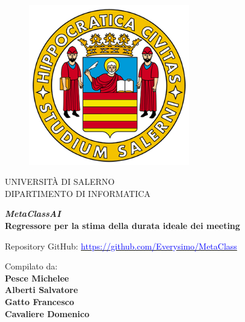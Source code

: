 \documentclass[a4paper, twoside, openright]{article}
\begin{document}
\begin{figure}[H]
    \centering
    \includegraphics[width=7cm]{img/logo.png}
\end{figure}

\begin{center}
    \LARGE{UNIVERSITÀ DI SALERNO}
    \vspace{1mm}
    \\ \large{DIPARTIMENTO DI INFORMATICA }
    \vspace{5mm}
\end{center}

\vspace{10mm}
\begin{center}
    {\LARGE{\bf \textit{MetaClassAI}\\\vspace{5mm} Regressore per la stima della durata ideale dei meeting}}
\end{center}

\vspace{5mm}
\begin{center}
    \centering
    \large{Repository GitHub:}
    \href{https://github.com/smike18181/MetaClass_FIA}{\textcolor{blue}{https://github.com/Everysimo/MetaClass}}
\end{center}

\vspace{20mm}

\begin{center}
        {\centering
        \large {Compilato da:} \\
        \vspace{2mm}
        \normalsize \textbf{Pesce Michelee} \\
        \vspace{2mm}
        \normalsize \textbf{Alberti Salvatore} \\
        \vspace{2mm}
        \normalsize \textbf{Gatto Francesco} \\
        \vspace{2mm}
        \normalsize \textbf{Cavaliere Domenico} \\}   
\end{center}    
\end{document}
